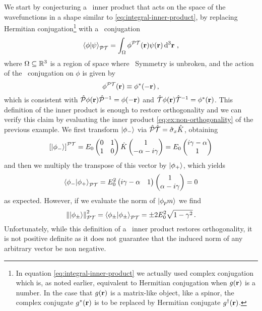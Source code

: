             We start by conjecturing \cite{bender2024} a \PT\ inner product that acts on the space of the wavefunctions in a shape similar to \eqref{eq:integral-inner-product}, by replacing Hermitian conjugation\footnote{In equation \eqref{eq:integral-inner-product} we actually used complex conjugation which is, as noted earlier, equivalent to Hermitian conjugation when $g\pqty{\vb{r}}$ is a number. In the case that $g\pqty{\vb{r}}$ is a matrix-like object, like a spinor, the complex conjugate $g^*\pqty{\vb{r}}$ is to be replaced by Hermitian conjugate $g^\dag\pqty{\vb{r}}$.} with a \PT\ conjugation
            \begin{equation}
                \label{eq:PT-inner-product-integral}
                \braket{\phi}{\psi}_{\PT} = \int\nolimits_{\Omega} \phi^{\PT}\pqty{\vb{r}} \psi\pqty{\vb{r}} \dd[3]{\vb{r}}
                \mycomma
            \end{equation}
            where $\Omega\subseteq\mathbb{R}^3$ is a region of space where \PT\ Symmetry is unbroken, and the action of the \PT\ conjugation on $\phi$ is given by
            \begin{equation*}
                \phi^{\PT}\pqty{\vb{r}} \equiv \phi^*\pqty{-\vb{r}}
                \mycomma
            \end{equation*}
            which is consistent with $\hP \phi\pqty{\vb{r}} \hP^{-1} = \phi\pqty{{-\vb{r}}}$ and $\hT \phi\pqty{\vb{r}} \hT^{-1} = \phi^*\pqty{{\vb{r}}}$. This definition of the inner product is enough to restore orthogonality and we can verify this claim by evaluating the inner product \eqref{eq:ex:non-orthogonality} of the previous example. We first transform $\ket{\phi_-}$ via $\mathcal{\hat{P}}\mathcal{\hat{T}} = \hat{\sigma}_x \hat{K}$, obtaining
            \begin{equation*}
                \bqty{\ket{\phi_-}}^{\PT} = E_0 \pmqty{\admat[0]{1,1}} \hK \pmqty{1 \\ -\alpha - i \gamma } = E_0 \pmqty{i \gamma - \alpha \\ 1}
            \end{equation*}
            and then we multiply the transpose of this vector by $\ket{\phi_+}$, which yields
            \begin{equation*}
                \braket{\phi_-}{\phi_+}_{\PT} = E_0^2 \pmqty{i\gamma - \alpha & 1} \pmqty{1\\ \alpha - i \gamma} = 0
            \end{equation*}
            as expected. However, if we evaluate the norm of $\ket{\phi_pm}$ we find
            \begin{equation*}
                \norm{\ket{\phi_\pm}}^2_{\mathcal{P}\mathcal{T}} = \braket{\phi_\pm}{\phi_\pm}_{\mathcal{P}\mathcal{T}} = \pm 2 E_0^2 \sqrt{1 - \gamma^2}
                \,\text{.}
            \end{equation*}
            Unfortunately, while this definition of a \PT\ inner product restores orthogonality, it is not positive definite as it does not guarantee that the induced norm of any arbitrary vector be non negative.

